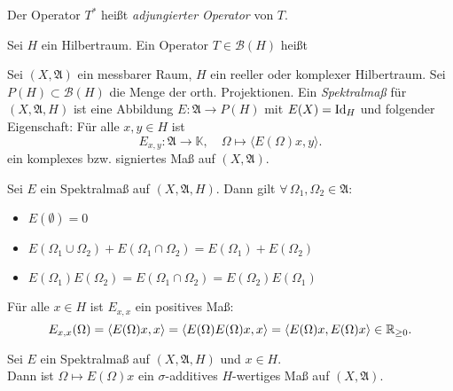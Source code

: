 \documentclass{cheat-sheet}
\newcommand{\K}{\mathbb{K}} %
\newcommand{\Alg}{\mathfrak{A}} %
\newcommand{\Boun}{\mathcal{B}} %
\newcommand{\scp}[2]{\langle #1 , #2 \rangle} %
\begin{document}
\begin{defn}
  Der Operator $T^*$ heißt \emph{adjungierter Operator} von $T$.
\end{defn}

\begin{defn}
  Sei $H$ ein Hilbertraum.
  Ein Operator $T \in \Boun(H)$ heißt \\
   \enspace
\end{defn}

\begin{defn}
  Sei $(X, \Alg)$ ein messbarer Raum, $H$ ein reeller oder komplexer Hilbertraum. Sei $P(H) \subset \Boun(H)$ die Menge der orth. Projektionen. Ein \emph{Spektralmaß} für $(X, \Alg, H)$ ist eine Abbildung $E : \Alg \to P(H)$ mit $E(X) = \operatorname{Id}_H$ und folgender Eigenschaft:
  Für alle $x, y \in H$ ist
  \[
    E_{x,y} : \Alg \to \K, \quad
    \Omega \mapsto \scp{E(\Omega)x}{y}.
  \]
  ein komplexes bzw. signiertes Maß auf $(X, \Alg)$.
\end{defn}

\begin{bem}
  Sei $E$ ein Spektralmaß auf $(X, \Alg, H)$. Dann gilt $\forall \, \Omega_1, \Omega_2 \in \Alg$:
  \begin{itemize}
    \item $E(\emptyset) = 0$
    \item $E(\Omega_1 \cup \Omega_2) + E(\Omega_1 \cap \Omega_2) = E(\Omega_1) + E(\Omega_2)$ 
    \item $E(\Omega_1) E(\Omega_2) = E(\Omega_1 \!\cap\! \Omega_2) = E(\Omega_2) E(\Omega_1)$ 
  \end{itemize}
\end{bem}

\begin{bem}
  Für alle $x \in H$ ist $E_{x,x}$ ein positives Maß:
  \[ E_{x,x}(\Omega) = \scp{E(\Omega)x}{x} = \scp{E(\Omega) E(\Omega) x}{x} = \scp{E(\Omega) x}{E(\Omega) x} \in \R_{\geq 0}. \]
\end{bem}

\begin{prop}
  Sei $E$ ein Spektralmaß auf $(X, \Alg, H)$ und $x \in H$. \\
  Dann ist $\Omega \mapsto E(\Omega)x$ ein $\sigma$-additives $H$-wertiges Maß auf $(X, \Alg)$.
\end{prop}
\end{document}
